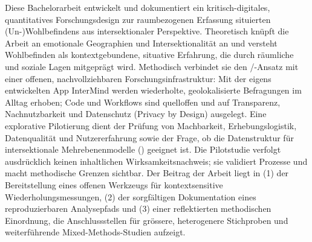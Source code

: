 Diese Bachelorarbeit entwickelt und dokumentiert ein kritisch-digitales, quantitatives Forschungsdesign zur raumbezogenen Erfassung situierten (Un\nobreakdash-)Wohlbefindens aus intersektionaler Perspektive. Theoretisch knüpft die Arbeit an emotionale Geographien und Intersektionalität an und versteht Wohlbefinden als kontextgebundene, situative Erfahrung, die durch räumliche und soziale Lagen mitgeprägt wird. Methodisch verbindet sie den /-Ansatz mit einer offenen, nachvollziehbaren Forschungsinfrastruktur: Mit der eigens entwickelten App InterMind werden wiederholte, geolokalisierte Befragungen im Alltag erhoben; Code und Workflows sind quelloffen und auf Transparenz, Nachnutzbarkeit und Datenschutz (Privacy by Design) ausgelegt. Eine explorative Pilotierung dient der Prüfung von Machbarkeit, Erhebungslogistik, Datenqualität und Nutzererfahrung sowie der Frage, ob die Datenstruktur für intersektionale Mehrebenenmodelle () geeignet ist. Die Pilotstudie verfolgt ausdrücklich keinen inhaltlichen Wirksamkeitsnachweis; sie validiert Prozesse und macht methodische Grenzen sichtbar. Der Beitrag der Arbeit liegt in (1) der Bereitstellung eines offenen Werkzeugs für kontextsensitive Wiederholungsmessungen, (2) der sorgfältigen Dokumentation eines reproduzierbaren Analysepfads und (3) einer reflektierten methodischen Einordnung, die Anschlussstellen für grössere, heterogenere Stichproben und weiterführende Mixed-Methods-Studien aufzeigt.